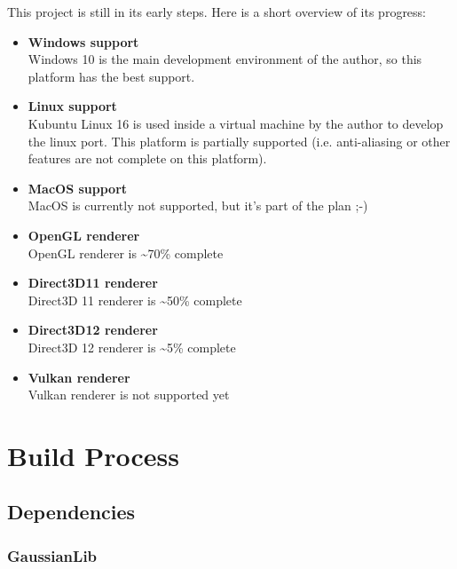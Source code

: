 \documentclass{article}
\begin{document}
This project is still in its early steps. Here is a short overview of its progress:
\begin{itemize}
	\item \textbf{Windows support} \\
	Windows 10 is the main development environment of the author, so this platform has the best support.
	
	\item \textbf{Linux support} \\
	Kubuntu Linux 16 is used inside a virtual machine by the author to develop the linux port.
	This platform is partially supported (i.e. anti-aliasing or other features are not complete on this platform).
	
	\item \textbf{MacOS support} \\
	MacOS is currently not supported, but it's part of the plan ;-)
	
	\item \textbf{OpenGL renderer} \\
	OpenGL renderer is \textasciitilde 70\% complete
	
	\item \textbf{Direct3D11 renderer} \\
	Direct3D 11 renderer is \textasciitilde 50\% complete
	
	\item \textbf{Direct3D12 renderer} \\
	Direct3D 12 renderer is \textasciitilde 5\% complete
	
	\item \textbf{Vulkan renderer} \\
	Vulkan renderer is not supported yet
\end{itemize}



\newpage
\section*{Build Process}

\subsection*{Dependencies}

\subsubsection*{GaussianLib}
\end{document}
